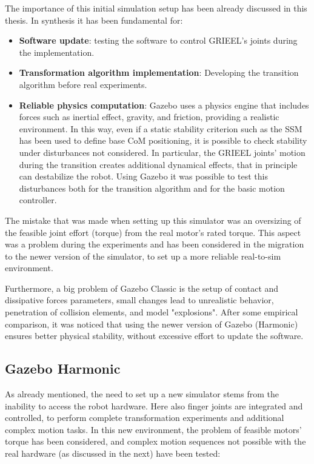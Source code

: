 The importance of this initial simulation setup has been already discussed in this thesis. 
In synthesis it has been fundamental for: 
\begin{itemize}
    \setlength\itemsep{-0.7em} 
    \item \textbf{Software update}: testing the software to control GRIEEL's joints during the implementation.
    \item \textbf{Transformation algorithm implementation}: Developing the transition algorithm before real experiments.
    \item \textbf{Reliable physics computation}: Gazebo uses a physics engine that includes forces such as inertial effect, gravity, and friction, providing a realistic environment. In this way, even if a static stability criterion such as the SSM has been used to define base CoM positioning, it is possible to check stability under disturbances not considered. In particular, the GRIEEL joints' motion during the transition creates additional dynamical effects, that in principle can destabilize the robot. Using Gazebo it was possible to test this disturbances both for the transition algorithm and for the basic motion controller. 
\end{itemize}

The mistake that was made when setting up this simulator was an oversizing of the feasible joint effort (torque) from the real motor's rated torque. This aspect was a problem during the experiments and has been considered in the migration to the newer version of the simulator, to set up a more reliable real-to-sim environment.  

Furthermore, a big problem of Gazebo Classic is the setup of contact and dissipative forces parameters, small changes lead to unrealistic behavior, penetration of collision elements, and model "explosions". After some empirical comparison, it was noticed that using the newer version of Gazebo (Harmonic) ensures better physical stability, without excessive effort to update the software. 

\subsection{Gazebo Harmonic}
\label{sec:gz_harmonic}

As already mentioned, the need to set up a new simulator stems from the inability to access the robot hardware.
Here also finger joints are integrated and controlled, to perform complete transformation experiments and additional complex motion tasks.
In this new environment, the problem of feasible motors' torque has been considered, and complex motion sequences not possible with the real hardware (as discussed in the next) have been tested: 

